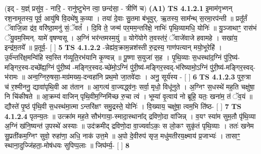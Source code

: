 \documentclass[17pt]{extarticle}
\begin{document}
                  \newline
                      (इद् - य॒ज्ञ्ं प्रसु॑व॒ - नारि॒ - रानु॑ष्टुभेन त्वा॒ छन्द॑सा॒ - त्रीणि॑ च)  \textbf{(A1)} \newline \newline
                                        \textbf{ TS 4.1.2.1} \newline
                  इ॒माम॑गृभ्णन् रश॒नामृ॒तस्य॒ पूर्व॒ आयु॑षि वि॒दथे॑षु क॒व्या । तया॑ दे॒वाः सु॒तमा ब॑भूवुर्. ऋ॒तस्य॒ साम᳚न्थ् स॒रमा॒रप॑न्ती ॥ प्रतू᳚र्तं ॅवाजि॒न्ना द्र॑व॒ वरि॑ष्ठा॒मनु॑ सं॒ॅवतं᳚ । दि॒वि ते॒ जन्म॑ पर॒मम॒न्तरि॑क्षे॒ नाभिः॑ पृथि॒व्यामधि॒ योनिः॑ ॥ यु॒ञ्जाथाꣳ॒॒ रास॑भं ॅयु॒वम॒स्मिन्. यामे॑ वृषण्वसू । अ॒ग्निं भर॑न्तमस्म॒युं ॥ योगे॑योगे त॒वस्त॑रं॒ ॅवाजे॑वाजे हवामहे । सखा॑य॒ इन्द्र॑म॒तये᳚ ॥ प्र॒तूर्व॒- [  ] \textbf{  5} \newline
                  \newline
                                \textbf{ TS 4.1.2.2} \newline
                  -न्नेह्य॑व॒क्राम॒न्नश॑स्ती रु॒द्रस्य॒ गाण॑पत्यान् मयो॒भूरेहि॑ । उ॒र्व॑न्तरि॑क्ष॒मन्वि॑हि स्व॒स्ति ग॑व्यूति॒रभ॑यानि कृ॒ण्वन्न् ॥ पू॒ष्णा स॒युजा॑ स॒ह । पृ॒थि॒व्याः स॒धस्था॑द॒ग्निं पु॑रि॒ष्य॑-मङ्गिर॒स्व-दच्छे᳚ह्य॒ग्निं पु॑री॒ष्य॑ -मङ्गिर॒स्वद-च्छे॑मो॒ऽग्निं पु॑री॒ष्य॑-मङ्गिर॒स्वद्-भ॑रिष्यामो॒ऽग्निं पु॑री॒ष्य॑-मङ्गिर॒स्वद्-भ॑रामः ॥ अन्व॒ग्निरु॒षसा॒-मग्र॑मख्य॒-दन्वहा॑नि प्रथ॒मो जा॒तवे॑दाः । अनु॒ सूर्य॑स्य - [  ] \textbf{  6} \newline
                  \newline
                                \textbf{ TS 4.1.2.3} \newline
                  पुरु॒त्रा च॑ र॒श्मीननु॒ द्यावा॑पृथि॒वी आ त॑तान ॥ आ॒गत्य॑ वा॒ज्यद्ध्व॑नः॒ सर्वा॒ मृधो॒ विधू॑नुते । अ॒ग्निꣳ स॒धस्थे॑ मह॒ति चक्षु॑षा॒ नि चि॑कीषते ॥ आ॒क्रम्य॑ वाजिन् पृथि॒वीम॒ग्निमि॑च्छ रु॒चा त्वं । भूम्या॑ वृ॒त्वाय॑ नो ब्रूहि॒ यतः॒ खना॑म॒ तं ॅव॒यं ॥ द्यौस्ते॑ पृ॒ष्ठं पृ॑थि॒वी स॒धस्थ॑मा॒त्मा ऽन्तरि॑क्षꣳ समु॒द्रस्ते॒ योनिः॑ । वि॒ख्याय॒ चक्षु॑षा॒ त्वम॒भि ति॑ष्ठ- [  ] \textbf{  7} \newline
                  \newline
                                \textbf{ TS 4.1.2.4} \newline
                  पृतन्य॒तः ॥ उत्क्रा॑म मह॒ते सौभ॑गाया॒-स्मादा॒स्थाना᳚द् द्रविणो॒दा वा॑जिन्न् । व॒यꣳ स्या॑म सुम॒तौ पृ॑थि॒व्या अ॒ग्निं ख॑नि॒ष्यन्त॑ उ॒पस्थे॑ अस्याः ॥ उद॑क्रमीद् द्रविणो॒दा वा॒ज्यर्वाऽकः॒ स लो॒कꣳ सुकृ॑तं पृथि॒व्याः । ततः॑ खनेम सु॒प्रती॑कम॒ग्निꣳ सुवो॒ रुहा॑णा॒ अधि॒ नाक॑ उत्त॒मे ॥ अ॒पो दे॒वीरुप॑ सृज॒ मधु॑मतीरय॒क्ष्माय॑ प्र॒जाभ्यः॑ । तासाꣳ॒॒ स्थाना॒दुज्जि॑हता॒-मोष॑धयः सुपिप्प॒लाः ॥ जिघ॑र्म्य॒- [  ] \textbf{  8} \newline
\end{document}

